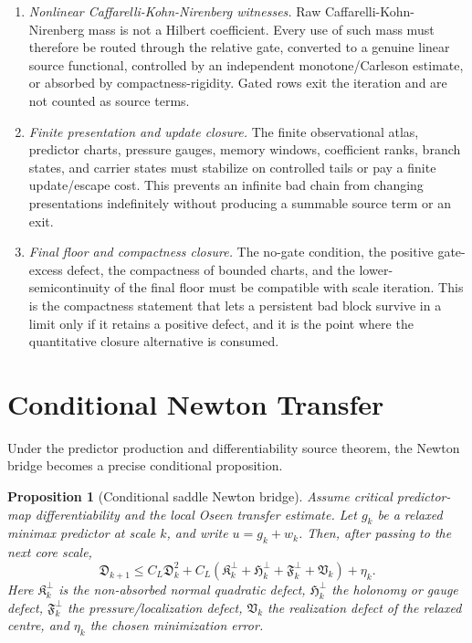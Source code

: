 \documentclass[11pt]{article}
\newtheorem{proposition}[theorem]{Proposition}
\begin{document}
\begin{enumerate}[label=(\roman*)]
\item \emph{Nonlinear Caffarelli-Kohn-Nirenberg witnesses.}  Raw
Caffarelli-Kohn-Nirenberg mass is not a Hilbert coefficient.  Every use of such
mass must therefore be routed through the relative gate, converted to a genuine
linear source functional, controlled by an independent monotone/Carleson
estimate, or absorbed by compactness-rigidity.  Gated rows exit the iteration and
are not counted as source terms.

\item \emph{Finite presentation and update closure.}  The finite observational
atlas, predictor charts, pressure gauges, memory windows, coefficient ranks,
branch states, and carrier states must stabilize on controlled tails or pay a
finite update/escape cost.  This prevents an infinite bad chain from changing
presentations indefinitely without producing a summable source term or an exit.

\item \emph{Final floor and compactness closure.}  The no-gate condition, the
positive gate-excess defect, the compactness of bounded charts, and the
lower-semicontinuity of the final floor must be compatible with scale iteration.
This is the compactness statement that lets a persistent bad block survive in a
limit only if it retains a positive defect, and it is the point where the
quantitative closure alternative is consumed.
\end{enumerate}

\section{Conditional Newton Transfer}

Under the predictor production and differentiability source theorem, the Newton
bridge becomes a precise conditional proposition.

\begin{proposition}[Conditional saddle Newton bridge]
Assume critical predictor-map differentiability and the local Oseen transfer estimate. Let \(g_k\) be a relaxed minimax predictor at scale \(k\), and write \(u=g_k+w_k\). Then, after passing to the next core scale,
\[
\mathfrak D_{k+1}
\le
C_L\mathfrak D_k^2
+C_L
\left(
\mathfrak K_k^\perp
+\mathfrak H_k^\perp
+\mathfrak F_k^\perp
+\mathfrak V_k
\right)
+\eta_k.
\]
Here \(\mathfrak K_k^\perp\) is the non-absorbed normal quadratic defect, \(\mathfrak H_k^\perp\) the holonomy or gauge defect, \(\mathfrak F_k^\perp\) the pressure/localization defect, \(\mathfrak V_k\) the realization defect of the relaxed centre, and \(\eta_k\) the chosen minimization error.
\end{proposition}
\end{document}
